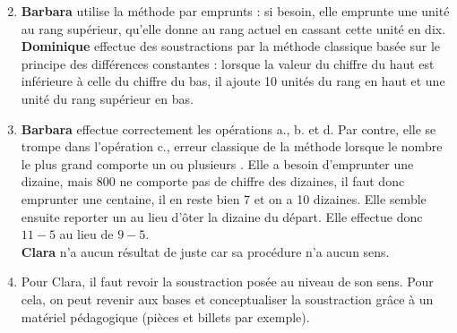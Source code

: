 \begin{corrige}
\begin{enumerate}
   \begin{enumerate}
      \setcounter{enumii}{1}
      \item {\bf Barbara} utilise la méthode par emprunts : si besoin, elle emprunte une unité au rang supérieur, qu'elle donne au rang actuel en cassant cette unité en dix. \\
      {\bf Dominique} effectue des soustractions par la méthode classique basée sur le principe des différences constantes : lorsque la valeur du chiffre du haut est inférieure à celle du chiffre du bas, il ajoute 10 unités du rang en haut et une unité du rang supérieur en bas.
      \item {\bf Barbara} effectue correctement les opérations a., b. et d. Par contre, elle se trompe dans l'opération c., erreur classique de la méthode lorsque le nombre le plus grand comporte un ou plusieurs  \fg. Elle a besoin d'emprunter une dizaine, mais 800 ne comporte pas de chiffre des dizaines, il faut donc emprunter une centaine, il en reste bien 7 et on a 10 dizaines. Elle semble ensuite reporter un  \fg{} au lieu d'ôter la dizaine du départ. Elle effectue donc $11-5$ au lieu de $9-5$. \\
      {\bf Clara} n'a aucun résultat de juste car sa procédure n'a aucun sens.
      \item Pour Clara, il faut revoir la soustraction posée au niveau de son sens. Pour cela, on peut revenir aux bases et conceptualiser la soustraction grâce à un matériel pédagogique (pièces et billets par exemple). \medskip
   \end{enumerate}
\end{enumerate}
\end{corrige}



